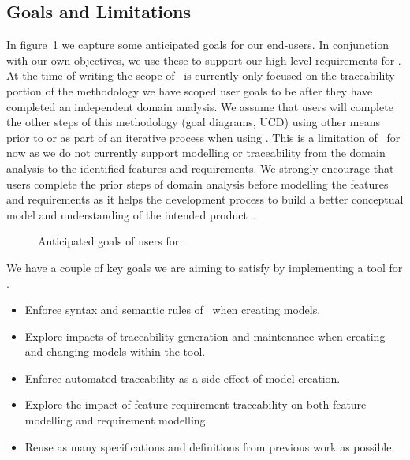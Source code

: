 \subsection{Goals and Limitations}

In figure~\ref{fig:CyclicL_goals} we capture some anticipated goals for our end-users. In conjunction with our own objectives, we use these to support our high-level requirements for \tool. At the time of writing the scope of \tool\ is currently only focused on the traceability portion of the methodology we have scoped user goals to be after they have completed an independent domain analysis. We assume that users will complete the other steps of this methodology (goal diagrams, \ac{UCD}) using other means prior to or as part of an iterative process when using \tool. This is a limitation of \tool\ for now as we do not currently support modelling or traceability from the domain analysis to the identified features and requirements. We strongly encourage that users complete the prior steps of domain analysis before modelling the features and requirements as it helps the development process to build a better conceptual model and understanding of the intended product~\cite{kang1990feature}.

\begin{figure}
	\centering
	
	\caption{Anticipated goals of users for \tool.}
	\label{fig:CyclicL_goals}
\end{figure}

We have a couple of key goals we are aiming to satisfy by implementing a tool for \tool. 

\begin{itemize}
	\item Enforce syntax and semantic rules of \tool\ when creating models.
	\item Explore impacts of traceability generation and maintenance when creating and changing models within the tool.
	\item Enforce automated traceability as a side effect of model creation.
	\item Explore the impact of feature-requirement traceability on both feature modelling and requirement modelling.
	\item Reuse as many specifications and definitions from previous work as possible.
\end{itemize}


